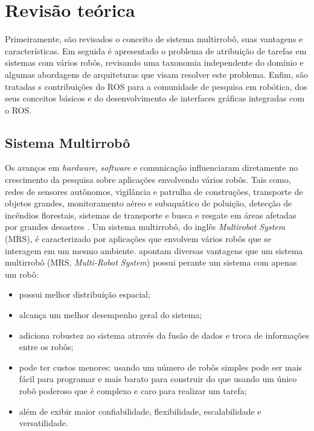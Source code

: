 \chapter[Revisão Teórica]{Revisão teórica} \label{cap:revisao}
    Primeiramente, são revisados o conceito de sistema multirrobô, suas vantagens e características. Em seguida é apresentado o problema de atribuição de tarefas em sistemas com vários robôs, revisando uma taxonomia independente do domínio e algumas abordagens de arquiteturas que visam resolver este problema. Enfim, são tratadas s contribuições do ROS para a comunidade de pesquisa em robótica, dos seus conceitos básicos e do desenvolvimento de interfaces gráficas integradas com o ROS.
    
    \section{Sistema Multirrobô} \label{sec:mrs}
        Os avanços em \textit{hardware}, \textit{software} e comunicação influenciaram diretamente no crescimento da pesquisa sobre aplicações envolvendo vários robôs. Tais como, redes de sensores autônomos, vigilância e patrulha de construções, transporte de objetos grandes, monitoramento aéreo e subaquático de poluição, detecção de incêndios florestais, sistemas de transporte e busca e resgate em áreas afetadas por grandes desastres \cite{ref:lima2005multi}. Um sistema multirrobô, do inglês \textit{Multirobot System} (MRS), é caracterizado por aplicações que envolvem vários robôs que se interagem em um mesmo ambiente.  apontam diversas vantagens que um sistema multirrobô (MRS, \textit{Multi-Robot System}) possui perante um sistema com apenas um robô:
        
        \begin{itemize}
            \item possui melhor distribuição espacial;
            \item alcança um melhor desempenho geral do sistema;
            \item adiciona robustez ao sistema através da fusão de dados e troca de informações entre os robôs;
            \item pode ter custos menores: usando um número de robôs simples pode ser mais fácil para programar e mais barato para construir do que usando um único robô poderoso que é complexo e caro para realizar um tarefa;
            \item além de exibir maior confiabilidade, flexibilidade, escalabilidade e versatilidade.
        \end{itemize}
        
